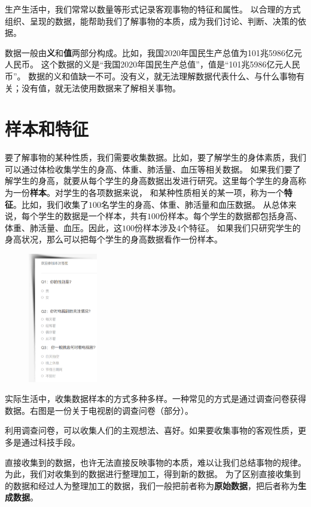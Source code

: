 \documentclass[12pt,UTF8]{ctexbook}
\begin{document}
生产生活中，我们常常以数量等形式记录客观事物的特征和属性。
以合理的方式组织、呈现的数据，能帮助我们了解事物的本质，成为我们讨论、判断、决策的依据。

数据一般由\textbf{义}和\textbf{值}两部分构成。比如，我国2020年国民生产总值为101兆5986亿元人民币。
这个数据的义是“我国2020年国民生产总值”，值是“101兆5986亿元人民币”。
数据的义和值缺一不可。没有义，就无法理解数据代表什么、与什么事物有关；没有值，就无法使用数据来了解相关事物。

\section{样本和特征}
要了解事物的某种性质，我们需要收集数据。比如，要了解学生的身体素质，我们可以通过体检收集学生的身高、体重、肺活量、血压等相关数据。
如果我们要了解学生的身高，就要从每个学生的身高数据出发进行研究。这里每个学生的身高称为一份\textbf{样本}。对学生的各项数据来说，
和某种性质相关的某一项，称为一个\textbf{特征}。比如，我们收集了$100$名学生的身高、体重、肺活量和血压数据。
从总体来说，每个学生的数据是一个样本，共有$100$份样本。每个学生的数据都包括身高、体重、肺活量、血压。因此，这$100$份样本涉及$4$个特征。
如果我们只研究学生的身高状况，那么可以把每个学生的身高数据看作一份样本。


\begin{figure} %
    \vspace{-20pt}
    \flushright
    \includegraphics[width=0.27\textwidth]{问卷调查2.png}
\end{figure}

实际生活中，收集数据样本的方式多种多样。一种常见的方式是通过调查问卷获得数据。右图是一份关于电视剧的调查问卷（部分）。

利用调查问卷，可以收集人们的主观想法、喜好。如果要收集事物的客观性质，更多是通过科技手段。

直接收集到的数据，也许无法直接反映事物的本质，难以让我们总结事物的规律。
为此，我们对收集到的数据进行整理加工，得到新的数据。
为了区别直接收集到的数据和经过人为整理加工的数据，我们一般把前者称为\textbf{原始数据}，把后者称为\textbf{生成数据}。
\end{document}
